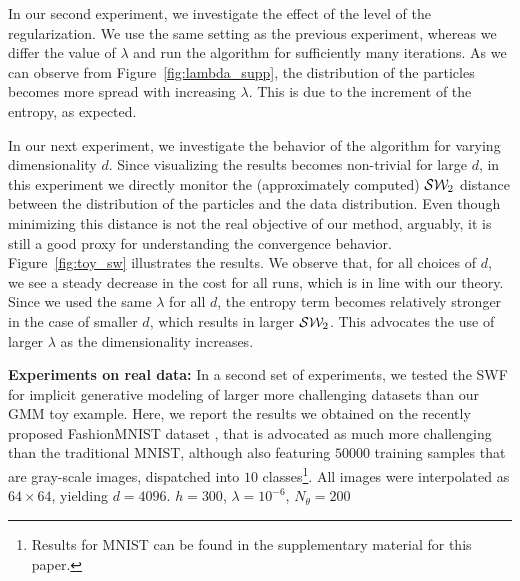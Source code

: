 In our second experiment, we investigate the effect of the level of the regularization. We use the same setting as the previous experiment, whereas we differ the value of $\lambda$ and run the algorithm for sufficiently many iterations. As we can observe from Figure~\ref{fig:lambda_supp}, the distribution of the particles becomes more spread with increasing $\lambda$. This is due to the increment of the entropy, as expected.



In our next experiment, we investigate the behavior of the algorithm for varying dimensionality $d$. Since visualizing the results becomes non-trivial for large $d$, in this experiment we directly monitor the (approximately computed) ${\cal S}{\cal W}_2$ distance between the distribution of the particles and the data distribution. Even though minimizing this distance is not the real objective of our method, arguably, it is still a good proxy for understanding the convergence behavior. 
%
Figure~\ref{fig:toy_sw} illustrates the results. We observe that, for all choices of $d$, we see a steady decrease in the cost for all runs, which is in line with our theory. Since we used the same $\lambda$ for all $d$, the entropy term becomes relatively stronger in the case of smaller $d$, which results in larger ${\cal S}{\cal W}_2$. This advocates the use of larger $\lambda$ as the dimensionality increases. 












\textbf{Experiments on real data: }
%
In a second set of experiments, we tested the SWF for implicit generative modeling of larger more challenging datasets than our GMM toy example. Here, we report the results we obtained on the recently proposed FashionMNIST dataset \cite{xiao2017fashion}, that is advocated as much more challenging than the traditional MNIST, although also featuring $50000$ training samples that are gray-scale images, dispatched into $10$ classes\footnote{Results for MNIST can be found in the supplementary material for this paper.}. All images were interpolated as $64\times 64$, yielding $d=4096$. $h=300$, $\lambda=10^{-6}$, $N_\theta=200$



